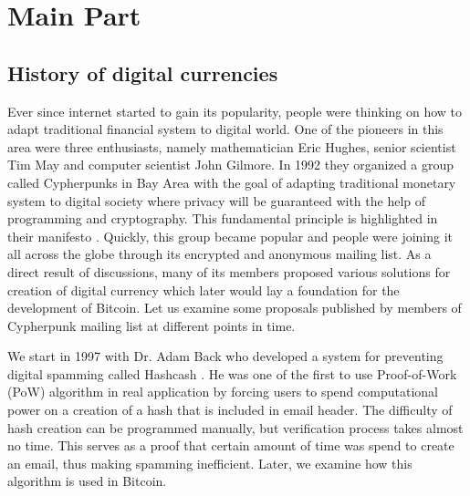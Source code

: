 \documentclass[conference,compsoc]{IEEEtran}
\begin{document}


\section{Main Part}

\subsection{History of digital currencies}
Ever since internet started to gain its popularity, people were thinking on how to adapt traditional financial system to digital world. 
One of the pioneers in this area were three enthusiasts, namely mathematician Eric Hughes, senior scientist Tim May and computer scientist John Gilmore.
In 1992 they organized a group called Cypherpunks in Bay Area with the goal of adapting traditional monetary system to digital society where privacy will be guaranteed with the help of programming and cryptography. 
This fundamental principle is highlighted in their manifesto \cite{manifesto}.
Quickly, this group became popular and people were joining it all across the globe through its encrypted and anonymous mailing list.
As a direct result of discussions, many of its members proposed various solutions for creation of digital currency which later would lay a foundation for the development of Bitcoin. 
Let us examine some proposals published by members of Cypherpunk mailing list at different points in time.

We start in 1997 with Dr. Adam Back who developed a system for preventing digital spamming called Hashcash \cite{hashcash}. 
He was one of the first to use Proof-of-Work (PoW) algorithm in real application by forcing users to spend computational power on a creation of a hash that is included in email header.  
The difficulty of hash creation can be programmed manually, but verification process takes almost no time.
This serves as a proof that certain amount of time was spend to create an email, thus making spamming inefficient. 
Later, we examine how this algorithm is used in Bitcoin. 
\end{document}
